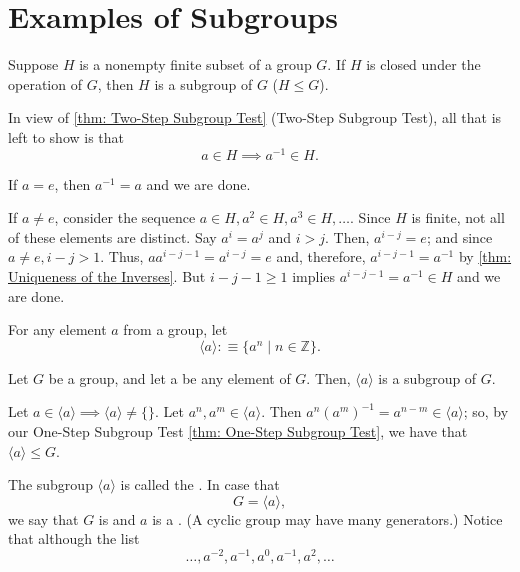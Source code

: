 \section{Examples of Subgroups}

\begin{thm}
  \label{thm: Finite Subgroup Test}
  Suppose $H$ is a nonempty finite subset of a group $G$. If $H$ is closed under the operation of $G$, then $H$ is a subgroup of $G$ ($H \leq G$).
\end{thm}
\begin{prf}
  In view of \ref{thm: Two-Step Subgroup Test} (Two-Step Subgroup Test), all that is left to show is that
  \begin{equation}
    a \in H \implies a^{-1} \in H.
  \end{equation}

  If $a=e$, then $a^{-1} = a$ and we are done.

  If $a \neq e$, consider the sequence $a \in H, a^2 \in H, a^3 \in H, \ldots.$ Since $H$ is finite, not all of these elements are distinct. Say $a^i=a^j$ and $i>j$. Then, $a^{i-j} = e$; and since $a\neq e, i-j >1$. Thus, $aa^{i-j-1} = a^{i-j}=e$ and, therefore, $a^{i-j-1}=a^{-1}$ by \ref{thm: Uniqueness of the Inverses}. But $i-j-1 \geq 1$ implies $a^{i-j-1}=a^{-1}\in H$ and we are done.
\end{prf}

\begin{mydef}
  For any element $a$ from a group, let
  \begin{equation}
    \langle a \rangle : \equiv \{ a^{n} \mid n \in \mathbb{Z} \}.
  \end{equation}
\end{mydef}

\begin{thm}
  Let $G$ be a group, and let a be any element of $G$. Then, $\langle a \rangle$ is a subgroup of $G$.
\end{thm}
\begin{prf}
  Let $a \in \langle a \rangle \implies \langle a \rangle \neq \{ \}.$ Let $a^n, a^m \in \langle a \rangle$. Then $a^n(a^m)^{-1} = a^{n-m} \in \langle a \rangle$; so, by our One-Step Subgroup Test \ref{thm: One-Step Subgroup Test}, we have that $\langle a \rangle \leq G$.
\end{prf}

The subgroup $\langle a \rangle$ is called the . In case that
\begin{equation}
  G= \langle a \rangle,
\end{equation}
we say that $G$ is  and $a$ is a . (A cyclic group may have many generators.) Notice that although the list
\begin{equation}
  \ldots, a^{-2}, a^{-1}, a^{0}, a^{-1}, a^{2}, \ldots
\end{equation}

